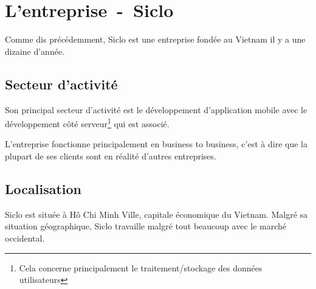 \documentclass[../main.tex]{subfiles}
\begin{document}
    \chapter{L'entreprise~-~Siclo}
        Comme dis précédemment, Siclo est une entreprise fondée au Vietnam il y a une dizaine d'année.
        \section{Secteur d'activité}
        Son principal secteur d'activité est le développement d'application mobile avec le développement côté serveur\footnote{Cela concerne principalement le traitement/stockage des données utilisateurs} qui est associé.

        L'entreprise fonctionne principalement en business to business, c'est à dire que la plupart de ses clients sont en réalité d'autres entreprises.
        \section{Localisation}
        Siclo est située à Hô Chi Minh Ville, capitale économique du Vietnam. Malgré sa situation géographique, Siclo travaille malgré tout beaucoup avec le marché occidental.
\end{document}
